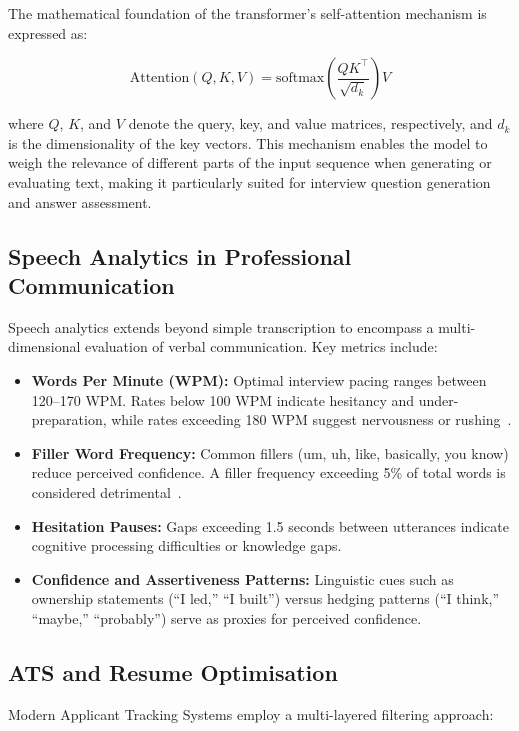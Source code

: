 \documentclass[12pt,a4paper,oneside]{report}
\begin{document}
The mathematical foundation of the transformer's self-attention mechanism is expressed as:

\begin{equation}
\text{Attention}(Q, K, V) = \text{softmax}\!\left(\frac{QK^{\top}}{\sqrt{d_k}}\right) V
\label{eq:attention}
\end{equation}

\noindent where $Q$, $K$, and $V$ denote the query, key, and value matrices, respectively, and $d_k$ is the dimensionality of the key vectors. This mechanism enables the model to weigh the relevance of different parts of the input sequence when generating or evaluating text, making it particularly suited for interview question generation and answer assessment.

\subsection{Speech Analytics in Professional Communication}
Speech analytics extends beyond simple transcription to encompass a multi-dimensional evaluation of verbal communication. Key metrics include:

\begin{itemize}
  \item \textbf{Words Per Minute (WPM):} Optimal interview pacing ranges between 120--170 WPM. Rates below 100 WPM indicate hesitancy and under-preparation, while rates exceeding 180 WPM suggest nervousness or rushing~\cite{ref_speech_rate}.
  \item \textbf{Filler Word Frequency:} Common fillers (um, uh, like, basically, you know) reduce perceived confidence. A filler frequency exceeding 5\% of total words is considered detrimental~\cite{ref_filler_impact}.
  \item \textbf{Hesitation Pauses:} Gaps exceeding 1.5 seconds between utterances indicate cognitive processing difficulties or knowledge gaps.
  \item \textbf{Confidence and Assertiveness Patterns:} Linguistic cues such as ownership statements (``I led,'' ``I built'') versus hedging patterns (``I think,'' ``maybe,'' ``probably'') serve as proxies for perceived confidence.
\end{itemize}

\subsection{ATS and Resume Optimisation}
Modern Applicant Tracking Systems employ a multi-layered filtering approach:
\end{document}
